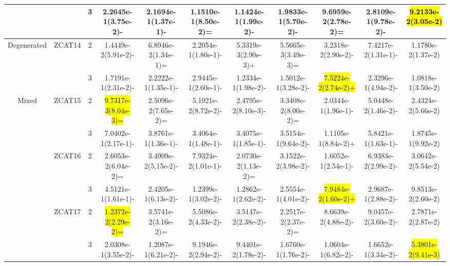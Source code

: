 \documentclass[a4paper,fleqn]{cas-dc}
\newcommand{\highlight}[1]{
	\begingroup
	\sethlcolor{Seashell}%
	\hl{#1}%
	\endgroup
}
\begin{document}
\begin{sloppypar}
\begin{table}[ht]
{\begin{tabular}{ccccccccccc}
					\multirow{6}{*}{~}&\multirow{2}{*}{~}&3	&2.2645e-1(3.75e-2)-		&2.1694e-1(1.37e-1)-	&1.1510e-1(8.50e-2)=	&1.1424e-1(1.99e-2)-	&1.9833e-1(5.70e-2)-	&9.6959e-2(2.78e-2)=	&2.8109e-1(9.78e-2)-	&\highlight{9.2133e-2(3.05e-2)}\\
					\hline
					
					\multirow{2}{*}{Degenerated}&\multirow{2}{*}{ZCAT14}&2&1.4449e-2(5.91e-2)-		&6.8946e-2(1.34e-1)=	&2.2054e-1(1.80e-1)-	&5.3319e-3(2.90e-3)+	&5.5665e-3(3.49e-3)=	&3.2318e-2(2.90e-2)-	&7.4217e-2(1.31e-1)-	&1.1780e-2(1.37e-2)\\
					
					\multirow{2}{*}{~}&\multirow{2}{*}{~}&3	&1.7191e-1(2.31e-2)-		&2.2222e-1(1.35e-1)-	&2.9445e-1(2.60e-1)-	&1.2334e-1(1.98e-2)-	&1.5012e-1(3.28e-2)-	&\highlight{7.5224e-2(2.74e-2)+}	&2.3296e-1(4.94e-2)-	&1.0818e-1(3.50e-2)\\
					\hline
					
					\multirow{12}{*}{Mixed}&\multirow{2}{*}{ZCAT15}&2&\highlight{9.7317e-3(8.04e-3)=}	&2.5096e-2(7.65e-2)=	&5.1921e-2(8.72e-2)-	&2.4795e-2(8.10e-3)-	&3.3408e-2(8.00e-2)=	&2.0344e-1(1.96e-1)-	&5.0448e-2(1.46e-2)-	&2.4324e-2(5.66e-2)\\
					
					\multirow{12}{*}{~}&\multirow{2}{*}{~}&3&7.0402e-1(2.17e-1)-		&3.8761e-1(1.36e-1)-	&3.4064e-1(1.48e-1)-	&3.4075e-1(1.85e-1)-	&3.5154e-1(9.64e-2)-	&1.1105e-1(8.84e-2)+	&5.8421e-1(1.63e-1)-	&1.8745e-1(9.92e-2)\\
					
					
					
					\multirow{12}{*}{~}&\multirow{2}{*}{ZCAT16}&2&2.6053e-2(6.04e-2)=		&3.4909e-2(5.15e-2)-	&7.9324e-2(1.01e-1)-	&2.0730e-2(1.13e-2)=	&3.1522e-2(3.98e-2)-	&1.6052e-1(2.54e-1)-	&6.9383e-2(2.99e-2)-	&3.0642e-2(5.54e-2)\\
					
					\multirow{12}{*}{~}&\multirow{2}{*}{~}&3&4.5121e-1(1.61e-1)-		&2.4205e-1(6.13e-2)-	&1.2399e-1(3.02e-2)-	&1.2862e-1(2.62e-2)-	&2.5554e-1(4.01e-2)-	&\highlight{7.9484e-2(1.60e-2)+}	&2.9687e-1(2.88e-2)-	&9.8513e-2(2.60e-2)\\
					
					\multirow{12}{*}{~}&\multirow{2}{*}{ZCAT17}&2&\highlight{1.2372e-2(2.29e-2)=}	&3.5741e-2(3.16e-2)=	&5.5086e-2(4.33e-2)-	&3.5147e-2(2.38e-2)-	&2.2517e-2(2.37e-2)=	&8.6639e-2(4.88e-2)-	&9.0457e-2(3.60e-2)-	&2.7871e-2(2.87e-2)\\
					
					\multirow{12}{*}{~}&\multirow{2}{*}{~}&3&2.0308e-1(3.55e-2)-	&1.2087e-1(6.21e-2)-	&9.1946e-2(2.94e-2)-	&9.4401e-2(1.78e-2)-	&1.6760e-1(1.76e-2)-	&1.0604e-1(6.82e-2)-	&1.6652e-1(3.34e-2)-	&\highlight{5.3801e-2(9.41e-3)}\\
					

\end{tabular}}
\end{table}
\end{sloppypar}
\end{document}
